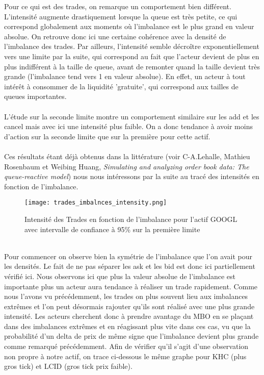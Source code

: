 \documentclass[12pt,a4paper]{article}
\theoremstyle{definition}
\theoremstyle{remark}
\begin{document}
Pour ce qui est des trades, on remarque un comportement bien différent. L'intensité augmente drastiquement lorsque la queue est très petite, ce qui correspond globalement aux moments où l'imbalance est le plus grand en valeur absolue. On retrouve donc ici une certaine cohérence avec la densité de l'imbalance des trades. Par ailleurs, l'intensité semble décroître exponentiellement vers une limite par la suite, qui correspond au fait que l'acteur devient de plus en plus indifférent à la taille de queue, avant de remonter quand la taille devient très grande (l'imbalance tend vers 1 en valeur absolue). En effet, un acteur à tout intérêt à consommer de la liquidité 'gratuite', qui correspond aux tailles de queues importantes. 
\\
\\
L'étude sur la seconde limite montre un comportement similaire sur les add et les cancel mais avec ici une intensité plus faible. On a donc tendance à avoir moins d'action sur la seconde limite que sur la première pour cette actif.
\\
\\
Ces résultats étant déjà obtenus dans la littérature (voir C-A.Lehalle, Mathieu Rosenbaum et Weibing Huang, \textit{Simulating and analyzing order book data:
The queue-reactive model}) nous nous intéressons par la suite au tracé des intensités en fonction de l'imbalance. 
\begin{figure}[h!]
    \centering
    \texttt{[image: trades\_imbalnces\_intensity.png]}
    \caption{Intensité des Trades en fonction de l'imbalance pour l'actif GOOGL avec intervalle de confiance à 95\% sur la première limite}
    \label{fig:trades}
\end{figure}
\\
Pour commencer on observe bien la symétrie de l'imbalance que l'on avait pour les densités. Le fait de ne pas séparer les ask et les bid est donc ici partiellement vérifié ici. Nous observons ici que plus la valeur absolue de l'imbalance est importante plus un acteur aura tendance à réaliser un trade rapidement.  Comme nous l'avons vu précédemment, les trades on plus souvent lieu aux imbalances extrêmes et l'on peut désormais rajouter qu'ils sont réalisé avec une plus grande intensité. Les acteurs cherchent donc à prendre avantage du MBO en se plaçant dans des imbalances extrêmes et en réagissant plus vite dans ces cas, vu que la probabilité d'un delta de prix de même signe que l'imbalance devient plus grande comme remarqué précédemment. Afin de vérifier qu'il s'agit d'une observation non propre à notre actif, on trace ci-dessous le même graphe pour KHC (plus gros tick) et LCID (gros tick prix faible).
\end{document}
